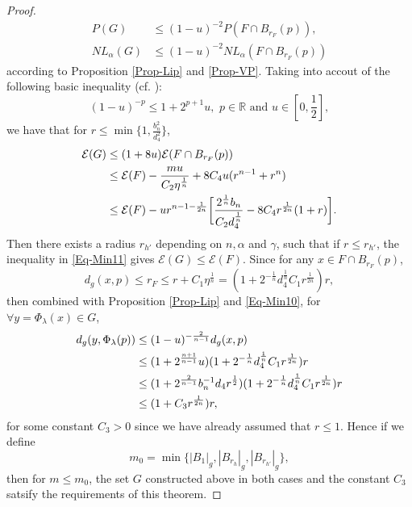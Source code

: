 \documentclass[11pt,reqno]{amsart}
\theoremstyle{definition}
\theoremstyle{remark}
\numberwithin{equation}{section}
\renewcommand{\(}{\left(}
\renewcommand{\)}{\right)}
\renewcommand{\-}{\overline}
\begin{document}
\begin{proof}
\begin{align}
	P(G)&\leq (1-u)^{-2} P(F\cap B_{r_F}(p)),\label{Eq-Min8}\\
	NL_{\alpha}(G)&\leq (1-u)^{-2}NL_{\alpha}(F\cap B_{r_F}(p))\label{Eq-Min9}
\end{align}
according to Proposition \ref{Prop-Lip} and \ref{Prop-VP}. Taking into accout of the following basic inequality (cf. \cite[Page 469]{Figalli15}):
\begin{equation}\label{Eq-Min10}
	(1-u)^{-p}\leq 1+2^{p+1}u,\,\,p\in\mathbb{R}\,\,\text{and}\,\,u\in[0,\frac{1}{2}],
\end{equation}
we have that for $r\leq\min\{1,\frac{b_n^2}{d_4^2}\}$,
\begin{align}
	\mathcal{E}(G)&\leq (1+8u)\mathcal{E}(F\cap B_{r_F}(p))\notag\\
	&\leq\mathcal{E}(F)-\frac{mu}{C_2\eta^{\frac{1}{n}}}+8C_4 u(r^{n-1}+r^n)\notag\\
	&\leq\mathcal{E}(F)-u r^{n-1-\frac{1}{2n}}\bigg[\frac{2^{\frac{1}{n}}b_n}{C_2 d_4^{\frac{1}{n}}}-8C_4 r^{\frac{1}{2n}}(1+r)\bigg].\label{Eq-Min11}
\end{align}
Then there exists a radius $r_{h'}$ depending on $n,\alpha$ and $\gamma$, such that if $r\leq r_{h'}$, the inequality in \eqref{Eq-Min11} gives $\mathcal{E}(G)\leq\mathcal{E}(F)$. Since for any $x\in F\cap B_{r_F}(p)$, 
\begin{equation*}
	d_g(x,p)\leq r_F\leq r+C_1\eta^{\frac{1}{n}}=(1+2^{-\frac{1}{n}}d_4^{\frac{1}{n}}C_1 r^{\frac{1}{2n}})r,
\end{equation*}
then combined with Proposition \ref{Prop-Lip} and \eqref{Eq-Min10}, for $\forall y=\Phi_{\lambda}(x)\in G$,
\begin{align}
	d_g(y,\Phi_{\lambda}(p))&\leq (1-u)^{-\frac{2}{n-1}} d_g(x,p)\notag\\
	&\leq (1+2^{\frac{n+1}{n-1}}u)(1+2^{-\frac{1}{n}}d_4^{\frac{1}{n}}C_1 r^{\frac{1}{2n}})r\notag\\
	&\leq (1+2^{\frac{2}{n-1}}b_n^{-1}d_4 r^{\frac{1}{2}})(1+2^{-\frac{1}{n}}d_4^{\frac{1}{n}}C_1 r^{\frac{1}{2n}})r\notag\\
	&\leq (1+C_3 r^{\frac{1}{2n}})r,
\end{align}
for some constant $C_3>0$ since we have already assumed that $r\leq 1$.
 Hence if we define 
\begin{equation}\label{Defn-m0}
	m_0=\min\{|B_1|_g,|B_{r_h}|_g,|B_{r_{h'}}|_g\},
\end{equation}
then for $m\leq m_0$, the set $G$ constructed above in both cases and the constant $C_3$ satsify the requirements of this theorem. 


\end{proof}
\end{document}

